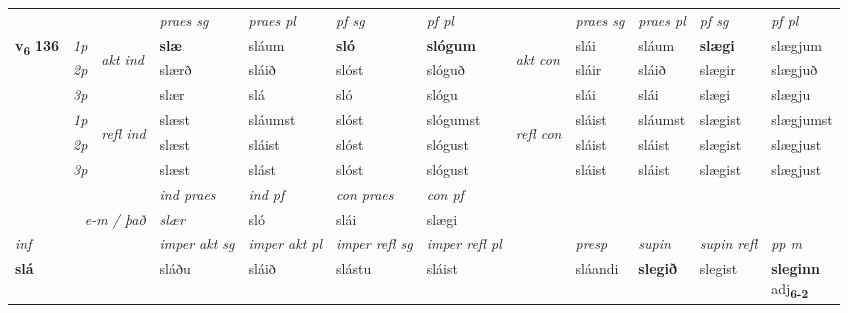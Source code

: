 \begin{longtable}[l]{X>{\footnotesize\itshape}llXXXXlXXXX}
 & &   & \textit{praes sg}  & \textit{praes pl}    & \textit{ pf sg} & \textit{pf pl} & & \textit{praes sg}  & \textit{praes pl}    & \textit{pf sg} & \textit{pf pl }  \\ \cmidrule{4-7} \cmidrule{9-12}
 \multirow{2}{*}{{{\textbf{v{\textsubscript{6}}} \Large{\textbf{136}}}}}  & 1p & \multirow{3}{*}{\begin{turn}{90}\textit{akt ind}\end{turn}} & \textbf{slæ} & sláum & \textbf{sló} & \textbf{slógum} & \multirow{3}{*}{\begin{turn}{90}\textit{akt con}\end{turn}} &slái & sláum & \textbf{slægi} & slægjum\\*
 & 2p &  &  slærð  & sláið & slóst & slóguð & & sláir & sláið & slægir & slægjuð \\*
 & 3p &  & slær & slá & sló & slógu & & slái & slái& slægi & slægju \\*
\cmidrule{4-7} \cmidrule{9-12}
 & 1p & \multirow{3}{*}{\begin{turn}{90}\textit{refl ind}\end{turn}}  & slæst & sláumst & slóst & slógumst & \multirow{3}{*}{\begin{turn}{90}\textit{refl con}\end{turn}}  &sláist & sláumst & slægist & slægjumst \\*
 & 2p &  & slæst & sláist & slóst & slógust & &sláist & sláist & slægist & slægjust \\*
 & 3p  & & slæst & slást & slóst & slógust & & sláist & sláist& slægist & slægjust \\*
\cmidrule{4-7} \cmidrule{9-12}

   && &  \textit{ind praes} & \textit{ind pf} & \textit{con praes} & \textit{con pf} \\*
\multicolumn{3}{r}{\textit{e-m / það}} & slær & sló & slái & slægi \\*

\cmidrule{4-7}
   {\textit{inf}} & &  & \textit{imper akt sg} & \textit{imper akt pl} & \textit{imper refl sg} & \textit{imper refl pl} && \textit{presp} & \textit{supin} & \textit{supin refl} & \textit{pp m} \\*
  {\textbf{slá}} & && sláðu  & sláið & slástu & sláist && sláandi &  \textbf{slegið} & slegist & \specialcell{\textbf{sleginn} \\ adj\textbf{\textsubscript{6-2}}} \\*

\midrule


\end{longtable}
